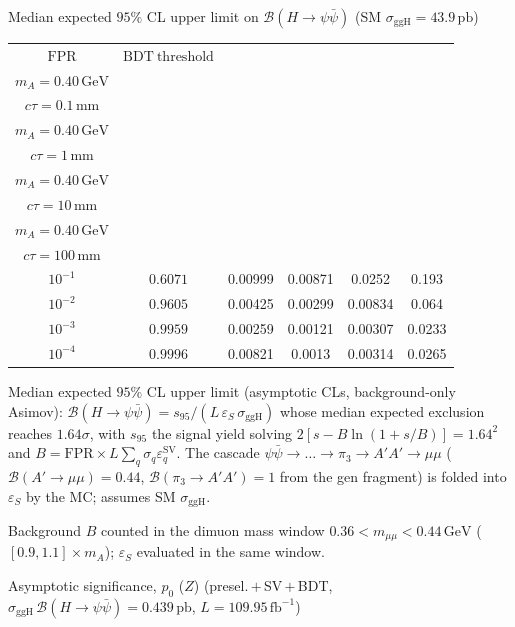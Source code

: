 \documentclass[10pt,a4paper]{article}
\begin{document}
{\vspace{12pt}

Median expected $95\%$ CL upper limit on $\mathcal{B}(H\to\psi\bar{\psi})$ (SM $\sigma_{\mathrm{ggH}}=43.9\,\mathrm{pb}$)

\begin{tabular}{cccccc}
\toprule
$\mathrm{FPR}$ & $\mathrm{BDT\ threshold}$ & \shortstack{$m_{\pi}=4\,\mathrm{GeV}$\\$m_{A}=0.40\,\mathrm{GeV}$\\$c\tau=0.1\,\mathrm{mm}$} & \shortstack{$m_{\pi}=4\,\mathrm{GeV}$\\$m_{A}=0.40\,\mathrm{GeV}$\\$c\tau=1\,\mathrm{mm}$} & \shortstack{$m_{\pi}=4\,\mathrm{GeV}$\\$m_{A}=0.40\,\mathrm{GeV}$\\$c\tau=10\,\mathrm{mm}$} & \shortstack{$m_{\pi}=4\,\mathrm{GeV}$\\$m_{A}=0.40\,\mathrm{GeV}$\\$c\tau=100\,\mathrm{mm}$} \\
\midrule
$10^{-1}$ & $0.6071$ & 0.00999 & 0.00871 & 0.0252 & 0.193\\
$10^{-2}$ & $0.9605$ & 0.00425 & 0.00299 & 0.00834 & 0.064\\
$10^{-3}$ & $0.9959$ & 0.00259 & 0.00121 & 0.00307 & 0.0233\\
$10^{-4}$ & $0.9996$ & 0.00821 & 0.0013 & 0.00314 & 0.0265\\
\bottomrule
\end{tabular}

{\small Median expected $95\%$ CL upper limit (asymptotic CLs, background-only Asimov): $\mathcal{B}(H\to\psi\bar{\psi})=s_{95}/(L\,\varepsilon_S\,\sigma_{\mathrm{ggH}})$ whose median expected exclusion reaches $1.64\sigma$, with $s_{95}$ the signal yield solving $2[s-B\ln(1{+}s/B)]=1.64^2$ and $B=\mathrm{FPR}\times L\sum_q\sigma_q\varepsilon_q^{\mathrm{SV}}$. The cascade $\psi\bar{\psi}\to\ldots\to\pi_3\to A'A'\to\mu\mu$ ($\mathcal{B}(A'\to\mu\mu)=0.44$, $\mathcal{B}(\pi_3\to A'A')=1$ from the gen fragment) is folded into $\varepsilon_S$ by the MC; assumes SM $\sigma_{\mathrm{ggH}}$.}

{\small Background $B$ counted in the dimuon mass window $0.36<m_{\mu\mu}<0.44\,\mathrm{GeV}$ ($[0.9,1.1]\times m_A$); $\varepsilon_S$ evaluated in the same window.}

\vspace{12pt}

Asymptotic significance, $p_0$ ($Z$) (presel.\,$+$\,SV\,$+$\,BDT, $\sigma_{\mathrm{ggH}}\,\mathcal{B}(H\to\psi\bar{\psi})=0.439\,\mathrm{pb}$, $L=109.95\,\mathrm{fb}^{-1}$)

}
\end{document}
